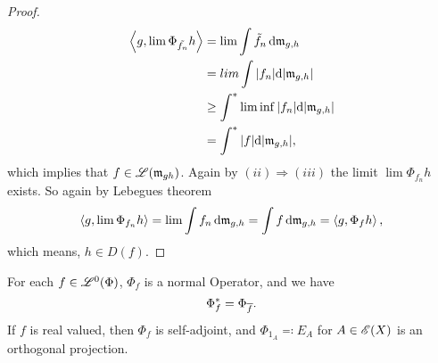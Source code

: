 \begin{proof}
 \begin{align*}
   \left\langle g, \lim \Phi_{\tilde{f_n}} h \right\rangle &= \lim \int \tilde{f}_n \operatorname{d}\! \mathfrak{m}_{g,h} \\
   &= lim \int |f_n| \text{d}  |\mathfrak{m}_{g,h}| \\
   &\geq \int ^{*} \liminf |f_n| \text{d}  |\mathfrak{m}_{g,h}| \\
   &= \int ^{*} |f| \text{d}  |\mathfrak{m}_{g,h}|,
 \end{align*}
 which implies that $f \in \mathscr{L}(\mathfrak{m}_{gh})$. 
 Again by $(ii) \Rightarrow (iii)$ the limit $\lim \Phi_{f_n} h $ exists.
 So again by Lebegues theorem
 \[
 \left\langle g, \lim \Phi_{f_n} h  \right\rangle = \lim \int f_n \operatorname{d}\! \mathfrak{m}_{g,h} = \int f \operatorname{d}\! \mathfrak{m}_{g,h}
 =\left\langle g, \Phi_f h \right\rangle,
 \]
which means, $h \in D(f)$. 


\end{proof}





\begin{lem}
  \label{maintheorem3}
 For each $f \in \mathscr{L}^0(\Phi)$, $\Phi_f$ is a normal Operator, and we have
\[
\Phi_f ^{*} = \Phi_{\overline{f}}. 
\]
If $f$ is real valued, then $\Phi_f$ is self-adjoint, and $\Phi_{1_A} \eqqcolon E_A$ for $ A \in \mathscr{E}(X)$ is an orthogonal projection. 
\end{lem}


